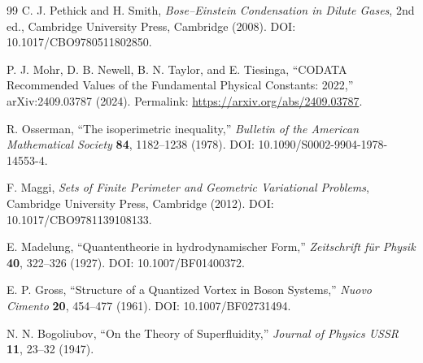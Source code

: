 \documentclass[11pt]{article}
\begin{document}
\begin{thebibliography}{99}
C. J. Pethick and H. Smith,
\emph{Bose--Einstein Condensation in Dilute Gases}, 2nd ed.,
Cambridge University Press, Cambridge (2008).
DOI: 10.1017/CBO9780511802850.

P. J. Mohr, D. B. Newell, B. N. Taylor, and E. Tiesinga,
``CODATA Recommended Values of the Fundamental Physical Constants: 2022,''
arXiv:2409.03787 (2024).
Permalink: \url{https://arxiv.org/abs/2409.03787}.

R. Osserman,
``The isoperimetric inequality,''
\emph{Bulletin of the American Mathematical Society} \textbf{84},
1182--1238 (1978).
DOI: 10.1090/S0002-9904-1978-14553-4.

F. Maggi,
\emph{Sets of Finite Perimeter and Geometric Variational Problems},
Cambridge University Press, Cambridge (2012).
DOI: 10.1017/CBO9781139108133.

E. Madelung,
``Quantentheorie in hydrodynamischer Form,''
\emph{Zeitschrift f\"ur Physik} \textbf{40}, 322--326 (1927).
DOI: 10.1007/BF01400372.

E. P. Gross,
``Structure of a Quantized Vortex in Boson Systems,''
\emph{Nuovo Cimento} \textbf{20}, 454--477 (1961).
DOI: 10.1007/BF02731494.

N. N. Bogoliubov,
``On the Theory of Superfluidity,''
\emph{Journal of Physics USSR} \textbf{11}, 23--32 (1947).

\end{thebibliography}
\end{document}
